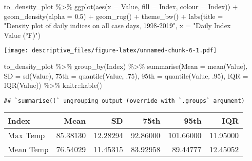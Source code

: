 \documentclass[
]{article}
\newenvironment{Shaded}{\begin{snugshade}}{\end{snugshade}}
\newcommand{\AttributeTok}[1]{\textcolor[rgb]{0.77,0.63,0.00}{#1}}
\newcommand{\DecValTok}[1]{\textcolor[rgb]{0.00,0.00,0.81}{#1}}
\newcommand{\FloatTok}[1]{\textcolor[rgb]{0.00,0.00,0.81}{#1}}
\newcommand{\FunctionTok}[1]{\textcolor[rgb]{0.00,0.00,0.00}{#1}}
\newcommand{\NormalTok}[1]{#1}
\newcommand{\OtherTok}[1]{\textcolor[rgb]{0.56,0.35,0.01}{#1}}
\newcommand{\SpecialCharTok}[1]{\textcolor[rgb]{0.00,0.00,0.00}{#1}}
\newcommand{\StringTok}[1]{\textcolor[rgb]{0.31,0.60,0.02}{#1}}
\begin{document}
\begin{Shaded}
\begin{Highlighting}[]
\NormalTok{to\_density\_plot }\SpecialCharTok{\%\textgreater{}\%}   
  \FunctionTok{ggplot}\NormalTok{(}\FunctionTok{aes}\NormalTok{(}\AttributeTok{x =}\NormalTok{ Value, }\AttributeTok{fill =}\NormalTok{ Index, }\AttributeTok{colour =}\NormalTok{ Index)) }\SpecialCharTok{+}
      \FunctionTok{geom\_density}\NormalTok{(}\AttributeTok{alpha =} \FloatTok{0.5}\NormalTok{) }\SpecialCharTok{+}
      \FunctionTok{geom\_rug}\NormalTok{() }\SpecialCharTok{+}
      \FunctionTok{theme\_bw}\NormalTok{() }\SpecialCharTok{+}
  \FunctionTok{labs}\NormalTok{(}\AttributeTok{title =} \StringTok{"Density plot of daily indices on all case days, 1998{-}2019"}\NormalTok{,}
       \AttributeTok{x =} \StringTok{"Daily Index Value (°F)"}\NormalTok{)}
\end{Highlighting}
\end{Shaded}

\texttt{[image: descriptive\_files/figure-latex/unnamed-chunk-6-1.pdf]}

\begin{Shaded}
\begin{Highlighting}[]
\NormalTok{to\_density\_plot }\SpecialCharTok{\%\textgreater{}\%} 
  \FunctionTok{group\_by}\NormalTok{(Index) }\SpecialCharTok{\%\textgreater{}\%} 
  \FunctionTok{summarise}\NormalTok{(}\AttributeTok{Mean =} \FunctionTok{mean}\NormalTok{(Value),}
            \AttributeTok{SD =} \FunctionTok{sd}\NormalTok{(Value),}
            \StringTok{\textasciigrave{}}\AttributeTok{75th}\StringTok{\textasciigrave{}} \OtherTok{=} \FunctionTok{quantile}\NormalTok{(Value, .}\DecValTok{75}\NormalTok{),}
            \StringTok{\textasciigrave{}}\AttributeTok{95th}\StringTok{\textasciigrave{}} \OtherTok{=} \FunctionTok{quantile}\NormalTok{(Value, .}\DecValTok{95}\NormalTok{),}
            \AttributeTok{IQR =} \FunctionTok{IQR}\NormalTok{(Value)) }\SpecialCharTok{\%\textgreater{}\%} 
\NormalTok{  knitr}\SpecialCharTok{::}\FunctionTok{kable}\NormalTok{()}
\end{Highlighting}
\end{Shaded}

\begin{verbatim}
## `summarise()` ungrouping output (override with `.groups` argument)
\end{verbatim}

\begin{longtable}[]{@{}lrrrrr@{}}
\toprule
Index & Mean & SD & 75th & 95th & IQR\tabularnewline
\midrule
\endhead
Max Temp & 85.38130 & 12.28294 & 92.86000 & 101.66000 &
11.95000\tabularnewline
Mean Temp & 76.54029 & 11.45315 & 83.92958 & 89.44777 &
12.45052\tabularnewline
\bottomrule
\end{longtable}
\end{document}
